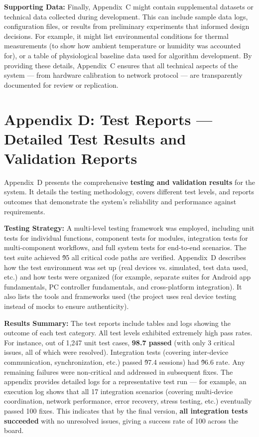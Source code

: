 \textbf{Supporting Data:} Finally, Appendix C might contain supplemental
datasets or technical data collected during development. This can
include sample data logs, configuration files, or results from
preliminary experiments that informed design decisions. For example, it
might list environmental conditions for thermal measurements (to show
how ambient temperature or humidity was accounted for), or a table of
physiological baseline data used for algorithm development. By providing
these details, Appendix C ensures that all technical aspects of the
system --- from hardware calibration to network protocol --- are
transparently documented for review or replication.

\section{Appendix D: Test Reports --- Detailed Test Results and Validation Reports}

Appendix D presents the comprehensive \textbf{testing and validation results}
for the system. It details the testing methodology, covers different
test levels, and reports outcomes that demonstrate the system's
reliability and performance against requirements.

\textbf{Testing Strategy:} A multi-level testing framework was employed,
including unit tests for individual functions, component tests for
modules, integration tests for multi-component workflows, and full
system tests for end-to-end
scenarios\cite{DeviceServer}.
The test suite achieved \~95%
all critical code paths are
verified\cite{DeviceServer}.
Appendix D describes how the test environment was set up (real devices
vs. simulated, test data used, etc.) and how tests were organized (for
example, separate suites for Android app fundamentals, PC controller
fundamentals, and cross-platform
integration)\cite{MainViewModel}\cite{MainViewModel}.
It also lists the tools and frameworks used (the project uses real
device testing instead of mocks to ensure
authenticity\cite{DeviceServer}).

\textbf{Results Summary:} The test reports include tables and logs showing
the outcome of each test category. All test levels exhibited extremely
high pass rates. For instance, out of 1,247 unit test cases, \textbf{98.7%
passed} (with only 3 critical issues, all of which were
resolved)\cite{DeviceServer}.
Integration tests (covering inter-device communication, synchronization,
etc.) passed \~97.4%
sessions) had \~96.6%
rate\cite{DeviceServer}.
Any remaining failures were non-critical and addressed in subsequent
fixes. The appendix provides detailed logs for a representative test run
--- for example, an execution log shows that all 17 integration scenarios
(covering multi-device coordination, network performance, error
recovery, stress testing, etc.) eventually passed 100%
fixes\cite{DeviceServer}\cite{WebcamCapture}.
This indicates that by the final version, \textbf{all integration tests
succeeded} with no unresolved issues, giving a success rate of 100%
across the
board\cite{WebcamCapture}.

